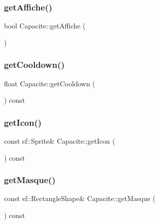 \mbox{\label{class_capacite_a6dd5ea561e52140a345be7e62a33cf1f}} 
\subsubsection{\texorpdfstring{get\+Affiche()}{getAffiche()}}
{\footnotesize\ttfamily bool Capacite\+::get\+Affiche (\begin{DoxyParamCaption}{ }\end{DoxyParamCaption})\hspace{0.3cm}{\ttfamily [inline]}}

\mbox{\label{class_capacite_a8b7b9b75b737fa5ef94997de294b84aa}} 
\subsubsection{\texorpdfstring{get\+Cooldown()}{getCooldown()}}
{\footnotesize\ttfamily float Capacite\+::get\+Cooldown (\begin{DoxyParamCaption}{ }\end{DoxyParamCaption}) const\hspace{0.3cm}{\ttfamily [inline]}}

\mbox{\label{class_capacite_aa66c20bba4433f871c91c3836a0c1929}} 
\subsubsection{\texorpdfstring{get\+Icon()}{getIcon()}}
{\footnotesize\ttfamily const sf\+::\+Sprite\& Capacite\+::get\+Icon (\begin{DoxyParamCaption}{ }\end{DoxyParamCaption}) const\hspace{0.3cm}{\ttfamily [inline]}}

\mbox{\label{class_capacite_a4585b46b989301b127a93dc062a0b8aa}} 
\subsubsection{\texorpdfstring{get\+Masque()}{getMasque()}}
{\footnotesize\ttfamily const sf\+::\+Rectangle\+Shape\& Capacite\+::get\+Masque (\begin{DoxyParamCaption}{ }\end{DoxyParamCaption}) const\hspace{0.3cm}{\ttfamily [inline]}}

